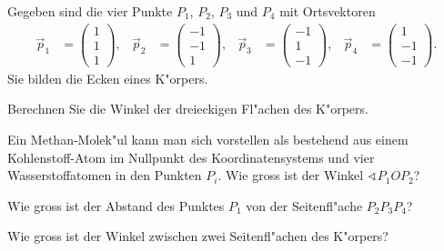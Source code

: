 Gegeben sind die vier Punkte 
$P_1$,
$P_2$,
$P_3$ und $P_4$
mit Ortsvektoren
\begin{align*}
\vec p_1&=\begin{pmatrix} 1\\ 1\\ 1\end{pmatrix},&
\vec p_2&=\begin{pmatrix}-1\\-1\\ 1\end{pmatrix},&
\vec p_3&=\begin{pmatrix}-1\\ 1\\-1\end{pmatrix},&
\vec p_4&=\begin{pmatrix} 1\\-1\\-1\end{pmatrix}.
\end{align*}
Sie bilden die Ecken eines K"orpers.
\begin{teilaufgaben}
\item Berechnen Sie die Winkel der dreieckigen Fl"achen des K"orpers.
\item Ein Methan-Molek"ul kann man sich vorstellen als bestehend aus
einem Kohlenstoff-Atom im Nullpunkt des Koordinatensystems und vier
Wasserstoffatomen in den Punkten $P_i$. Wie gross ist der Winkel
$\sphericalangle P_1 O P_2$?
\item Wie gross ist der Abstand des Punktes $P_1$ von der Seitenfl"ache
$P_2P_3P_4$?
\item Wie gross ist der Winkel zwischen zwei Seitenfl"achen des K"orpers?
\end{teilaufgaben}

